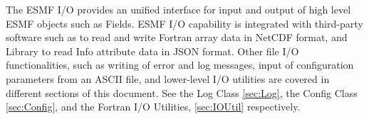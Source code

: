 

The ESMF I/O provides an unified interface for input and output of
high level ESMF objects such as Fields.  ESMF I/O capability is integrated
with third-party software such as 
to read and write Fortran array data in NetCDF format, and 
Library to read Info attribute data in JSON format.  Other file I/O
functionalities, such as writing of error and log messages, input of
configuration parameters from an ASCII file, and lower-level I/O utilities are
covered in different sections of this document.  See the Log Class 
\ref{sec:Log}, the Config Class \ref{sec:Config}, and the Fortran 
I/O Utilities, \ref{sec:IOUtil} respectively.

%
%


